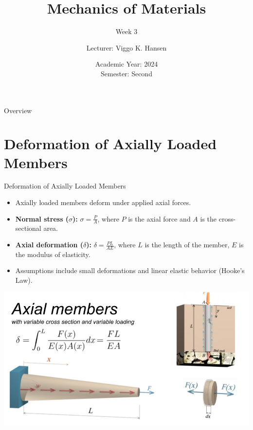 \documentclass{beamer}
\title[Mechanics of Materials]{Mechanics of Materials}
\subtitle{Week 3}
\author{Lecturer: Viggo K. Hansen}
\institute{Faculty of Engineering, Chulalongkorn University}
\date{Academic Year: 2024 \\ Semester: Second}
\begin{document}
\frame{\titlepage}

\begin{frame}{Overview}
    \tableofcontents
\end{frame}

\section{Deformation of Axially Loaded Members}
\begin{frame}{Deformation of Axially Loaded Members}
    \begin{minipage}[t]{0.4\textwidth}
        \begin{itemize}
            \item Axially loaded members deform under applied axial forces.
            \item \textbf{Normal stress ($\sigma$):} $\sigma = \frac{P}{A}$, where $P$ is the axial force and $A$ is the cross-sectional area.
            \item \textbf{Axial deformation ($\delta$):} $\delta = \frac{PL}{AE}$, where $L$ is the length of the member, $E$ is the modulus of elasticity.
            \item Assumptions include small deformations and linear elastic behavior (Hooke's Law).
        \end{itemize}
    \end{minipage}
    \hfill
    \begin{minipage}[t]{0.55\textwidth}
        \vspace{0pt}
        \includegraphics[width=\textwidth]{Axial_Deformation.png}
    \end{minipage}
\end{frame}

\end{document}
